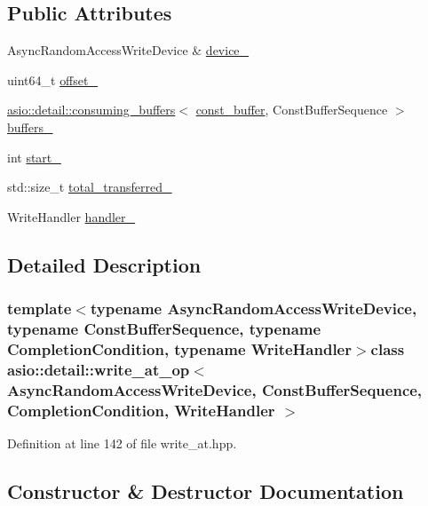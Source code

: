 \subsection*{Public Attributes}
\begin{DoxyCompactItemize}
\item 
Async\+Random\+Access\+Write\+Device \& \hyperlink{classasio_1_1detail_1_1write__at__op_a6b97c06ca4eae45e8d5c2d09f7e184eb}{device\+\_\+}
\item 
uint64\+\_\+t \hyperlink{classasio_1_1detail_1_1write__at__op_ac4bd5bf64bbd90b4652fb80052199c50}{offset\+\_\+}
\item 
\hyperlink{classasio_1_1detail_1_1consuming__buffers}{asio\+::detail\+::consuming\+\_\+buffers}$<$ \hyperlink{classasio_1_1const__buffer}{const\+\_\+buffer}, Const\+Buffer\+Sequence $>$ \hyperlink{classasio_1_1detail_1_1write__at__op_a3b5beffc43a0c4970d1071beaaad561b}{buffers\+\_\+}
\item 
int \hyperlink{classasio_1_1detail_1_1write__at__op_a21eba3719abc1e9fcc2a4cbcf8997413}{start\+\_\+}
\item 
std\+::size\+\_\+t \hyperlink{classasio_1_1detail_1_1write__at__op_a5c7c244023fc4c7c89c01c8698bbd2c2}{total\+\_\+transferred\+\_\+}
\item 
Write\+Handler \hyperlink{classasio_1_1detail_1_1write__at__op_ad162500a8d8acf7aa6b9e08179fdf35d}{handler\+\_\+}
\end{DoxyCompactItemize}


\subsection{Detailed Description}
\subsubsection*{template$<$typename Async\+Random\+Access\+Write\+Device, typename Const\+Buffer\+Sequence, typename Completion\+Condition, typename Write\+Handler$>$class asio\+::detail\+::write\+\_\+at\+\_\+op$<$ Async\+Random\+Access\+Write\+Device, Const\+Buffer\+Sequence, Completion\+Condition, Write\+Handler $>$}



Definition at line 142 of file write\+\_\+at.\+hpp.



\subsection{Constructor \& Destructor Documentation}
\hypertarget{classasio_1_1detail_1_1write__at__op_a908ed53ed0853e51e05863cf2325a3e3}{}
